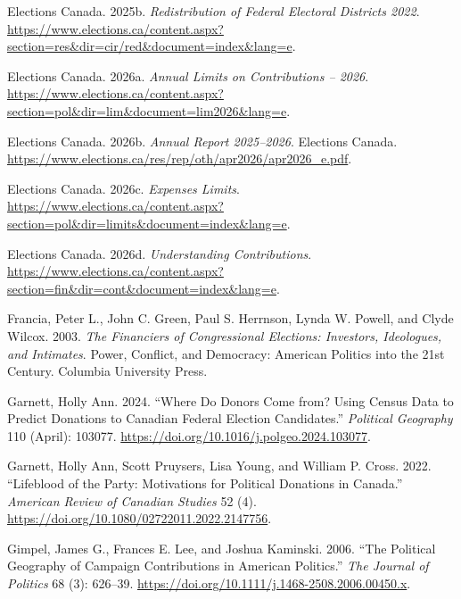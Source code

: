 \documentclass[
  letterpaper,
  DIV=11,
  numbers=noendperiod]{scrartcl}
\newlength{\cslhangindent}
\newenvironment{CSLReferences}[2] %
 {\begin{list}{}{%
  \setlength{\itemindent}{0pt}
  \setlength{\leftmargin}{0pt}
  \setlength{\parsep}{0pt}
  \ifodd #1
   \setlength{\leftmargin}{\cslhangindent}
   \setlength{\itemindent}{-1\cslhangindent}
  \fi
  \setlength{\itemsep}{#2\baselineskip}}}
 {\end{list}}
\begin{document}
\begin{CSLReferences}{1}{1}
Elections Canada. 2025b. \emph{Redistribution of {Federal} {Electoral}
{Districts} 2022}.
\url{https://www.elections.ca/content.aspx?section=res&dir=cir/red&document=index&lang=e}.

Elections Canada. 2026a. \emph{Annual {Limits} on {Contributions} --
2026}.
\url{https://www.elections.ca/content.aspx?section=pol&dir=lim&document=lim2026&lang=e}.

Elections Canada. 2026b. \emph{Annual Report 2025--2026}. Elections
Canada.
\url{https://www.elections.ca/res/rep/oth/apr2026/apr2026_e.pdf}.

Elections Canada. 2026c. \emph{Expenses {Limits}}.
\url{https://www.elections.ca/content.aspx?section=pol&dir=limits&document=index&lang=e}.

Elections Canada. 2026d. \emph{Understanding Contributions}.
\url{https://www.elections.ca/content.aspx?section=fin&dir=cont&document=index&lang=e}.

Francia, Peter L., John C. Green, Paul S. Herrnson, Lynda W. Powell, and
Clyde Wilcox. 2003. \emph{The Financiers of Congressional Elections:
Investors, Ideologues, and Intimates}. Power, Conflict, and Democracy:
American Politics into the 21st Century. Columbia University Press.

Garnett, Holly Ann. 2024. {``Where Do Donors Come from? {Using} Census
Data to Predict Donations to {Canadian} Federal Election Candidates.''}
\emph{Political Geography} 110 (April): 103077.
\url{https://doi.org/10.1016/j.polgeo.2024.103077}.

Garnett, Holly Ann, Scott Pruysers, Lisa Young, and William P. Cross.
2022. {``Lifeblood of the {Party}: {Motivations} for {Political}
{Donations} in {Canada}.''} \emph{American Review of Canadian Studies}
52 (4). \url{https://doi.org/10.1080/02722011.2022.2147756}.

Gimpel, James G., Frances E. Lee, and Joshua Kaminski. 2006. {``The
{Political} {Geography} of {Campaign} {Contributions} in {American}
{Politics}.''} \emph{The Journal of Politics} 68 (3): 626--39.
\url{https://doi.org/10.1111/j.1468-2508.2006.00450.x}.


\end{CSLReferences}
\end{document}
